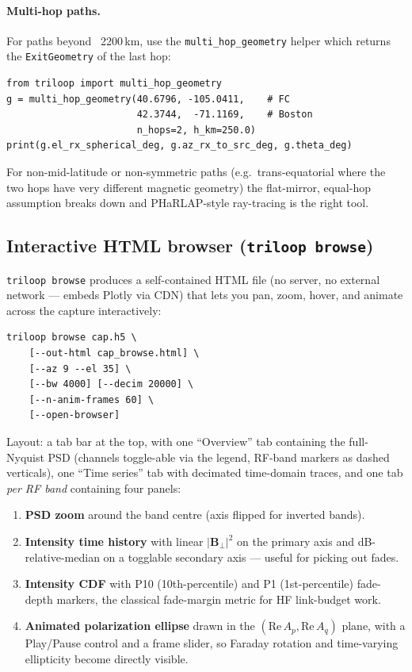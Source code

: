 \documentclass[11pt]{article}
\begin{document}
\paragraph{Multi-hop paths.}  For paths beyond ~2200\,km, use the
\texttt{multi\_hop\_geometry} helper which returns the
\texttt{ExitGeometry} of the last hop:
\begin{lstlisting}[style=py]
from triloop import multi_hop_geometry
g = multi_hop_geometry(40.6796, -105.0411,    # FC
                       42.3744,  -71.1169,    # Boston
                       n_hops=2, h_km=250.0)
print(g.el_rx_spherical_deg, g.az_rx_to_src_deg, g.theta_deg)
\end{lstlisting}
For non-mid-latitude or non-symmetric paths (e.g.\ trans-equatorial
where the two hops have very different magnetic geometry) the
flat-mirror, equal-hop assumption breaks down and PHaRLAP-style
ray-tracing is the right tool.

\subsection{Interactive HTML browser (\texttt{triloop browse})}
\label{sec:browse}

\texttt{triloop browse} produces a self-contained HTML file (no
server, no external network — embeds Plotly via CDN) that lets you
pan, zoom, hover, and animate across the capture interactively:

\begin{lstlisting}[style=shell]
triloop browse cap.h5 \
    [--out-html cap_browse.html] \
    [--az 9 --el 35] \
    [--bw 4000] [--decim 20000] \
    [--n-anim-frames 60] \
    [--open-browser]
\end{lstlisting}

Layout: a tab bar at the top, with one ``Overview'' tab containing
the full-Nyquist PSD (channels toggle-able via the legend, RF-band
markers as dashed verticals), one ``Time series'' tab with decimated
time-domain traces, and one tab \emph{per RF band} containing four
panels:

\begin{enumerate}\itemsep=2pt
\item \textbf{PSD zoom} around the band centre (axis flipped for
      inverted bands).
\item \textbf{Intensity time history} with linear $|\mathbf{B}_\perp|^2$
      on the primary axis and dB-relative-median on a togglable
      secondary axis — useful for picking out fades.
\item \textbf{Intensity CDF} with P10 (10th-percentile) and P1
      (1st-percentile) fade-depth markers, the classical fade-margin
      metric for HF link-budget work.
\item \textbf{Animated polarization ellipse} drawn in the
      $(\mathrm{Re}\,A_p, \mathrm{Re}\,A_q)$ plane, with a
      Play/Pause control and a frame slider, so Faraday rotation
      and time-varying ellipticity become directly visible.
\end{enumerate}
\end{document}
